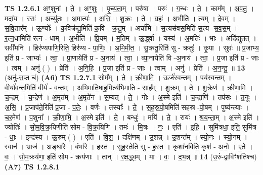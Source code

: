 \documentclass[17pt]{extarticle}
\begin{document}
                                \textbf{ TS 1.2.6.1} \newline
                  अꣳ॒॒शुना᳚ । ते॒ । अꣳ॒॒शुः । पृ॒च्य॒ता॒म् । परु॑षा । परुः॑ । ग॒न्धः । ते॒ । काम᳚म् । अ॒व॒तु॒ । मदा॑य । रसः॑ । अच्यु॑तः । अ॒मात्यः॑ । अ॒सि॒ । शु॒क्रः । ते॒ । ग्रहः॑ । अ॒भीति॑ । त्यम् । दे॒वम् । स॒वि॒तार᳚म् । ऊ॒ण्योः᳚ । क॒विक्र॑तु॒मिति॑ क॒वि - क्र॒तु॒म् । अर्चा॑मि । स॒त्यस॑वस॒मिति॑ स॒त्य -स॒व॒स॒म् । र॒त्न॒धामिति॑ रत्न - धाम् । अ॒भीति॑ । प्रि॒यम् । म॒तिम् । ऊ॒र्द्ध्वा । यस्य॑ । अ॒मतिः॑ । भाः । अदि॑द्युतत् । सवी॑मनि । हिर॑ण्यपाणि॒रिति॒ हिर॑ण्य - पा॒णिः॒ । अ॒मि॒मी॒त॒ । सु॒क्रतु॒रिति॑ सु - क्रतुः॑ । कृ॒पा । सुवः॑ ॥ प्र॒जाभ्य॒ इति॑ प्र - जाभ्यः॑ । त्वा॒ । प्रा॒णायेति॑ प्र - अ॒नाय॑ । त्वा॒ । व्या॒नायेति॑ वि -अ॒नाय॑ । त्वा॒ । प्र॒जा इति॑ प्र - जाः । त्वम् । अनु॑ ( ) । प्रेति॑ । अ॒नि॒हि॒ । प्र॒जा इति॑ प्र - जाः । त्वाम् । अनु॑ । प्रेति॑ । अ॒न॒न्तु॒ ॥ \textbf{  13} \newline
                  \newline
                       (अनु॑-स॒प्त च॑)  \textbf{(A6)} \newline \newline
                                \textbf{ TS 1.2.7.1} \newline
                  सोम᳚म् । ते॒ । क्री॒णा॒मि॒ । ऊर्ज॑स्वन्तम् । पय॑स्वन्तम् । वी॒र्या॑वन्त॒मिति॑ वी॒र्य॑ - व॒न्त॒म् । अ॒भि॒मा॒ति॒षाह॒मित्य॑भिमाति - साह᳚म् । शु॒क्रम् । ते॒ । शु॒क्रेण॑ । क्री॒णा॒मि॒ । च॒न्द्रम् । च॒न्द्रेण॑ । अ॒मृत᳚म् । अ॒मृते॑न । स॒म्यत् । ते॒ । गोः । अ॒स्मे इति॑ । च॒न्द्राणि॑ । तप॑सः । त॒नूः । अ॒सि॒ । प्र॒जाप॑ते॒रिति॑ प्र॒जा - प॒तेः॒ । वर्णः॑ । तस्याः᳚ । ते॒ । स॒ह॒स्र॒पो॒षमिति॑ सहस्र -पो॒षम् । पुष्य॑न्त्याः । च॒र॒मेण॑ । प॒शुना᳚ । क्री॒णा॒मि॒ । अ॒स्मे इति॑ । ते॒ । बन्धुः॑ । मयि॑ । ते॒ । रायः॑ । श्र॒य॒न्ता॒म् । अ॒स्मे इति॑ । ज्योतिः॑ । सो॒म॒वि॒क्र॒यिणीति॑ सोम - वि॒क्र॒यिणि॑ । तमः॑ । मि॒त्रः । नः॒ । एति॑ । इ॒हि॒ । सुमि॑त्रधा॒ इति॒ सुमि॑त्र - धाः॒ । इन्द्र॑स्य । ऊ॒रुम् ( ) । एति॑ । वि॒श॒ । दक्षि॑णम् । उ॒शन्न् । उ॒शन्त᳚म् । स्यो॒नः । स्यो॒नम् । स्वान॑ । भ्राज॑ । अङ्घा॑रे । बंभा॑रे । हस्त॑ । सुह॒स्तेति॒ सु - ह॒स्त॒ । कृशा॑न॒विति॒ कृश॑ - अ॒नो॒ । ए॒ते । वः॒ । सो॒म॒क्रय॑णा॒ इति॑ सोम - क्रय॑णाः । तान् । र॒क्ष॒द्ध्व॒म् । मा । वः॒ । द॒भ॒न्न् ॥ \textbf{  14 } \newline
                  \newline
                      (उ॒रुं-द्वाविꣳ॑शतिश्च)  \textbf{(A7)} \newline \newline
                                \textbf{ TS 1.2.8.1} \newline
\end{document}
